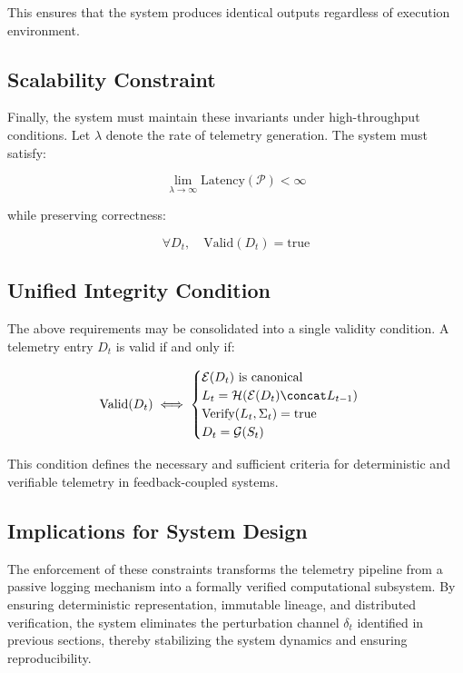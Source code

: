 This ensures that the system produces identical outputs regardless of execution environment.

\subsection{Scalability Constraint}

Finally, the system must maintain these invariants under high-throughput conditions. Let $\lambda$ denote the rate of telemetry generation. The system must satisfy:

\begin{equation}
\lim_{\lambda \to \infty} \text{Latency}(\mathcal{P}) < \infty
\end{equation}

while preserving correctness:

\begin{equation}
\forall D_t, \quad \text{Valid}(D_t) = \text{true}
\end{equation}

\subsection{Unified Integrity Condition}

The above requirements may be consolidated into a single validity condition. A telemetry entry $D_t$ is valid if and only if:

\begin{equation}
\text{Valid}(D_t) \iff 
\begin{cases}
\mathcal{E}(D_t) \text{ is canonical} \\
L_t = \mathcal{H}(\mathcal{E}(D_t) \concat L_{t-1}) \\
\text{Verify}(L_t, \Sigma_t) = \text{true} \\
D_t = \mathcal{G}(S_t)
\end{cases}
\end{equation}

This condition defines the necessary and sufficient criteria for deterministic and verifiable telemetry in feedback-coupled systems.

\subsection{Implications for System Design}

The enforcement of these constraints transforms the telemetry pipeline from a passive logging mechanism into a formally verified computational subsystem. By ensuring deterministic representation, immutable lineage, and distributed verification, the system eliminates the perturbation channel $\delta_t$ identified in previous sections, thereby stabilizing the system dynamics and ensuring reproducibility.

